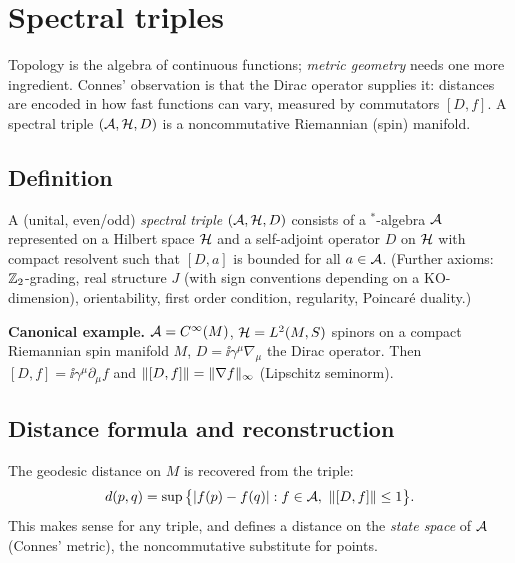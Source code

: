 \section{Spectral triples}\label{ch:spectral_triples}
\skippable

\begin{physmotiv}
Topology is the algebra of continuous functions; \emph{metric geometry} needs one more ingredient. Connes' observation is that the Dirac operator supplies it: distances are encoded in how fast functions can vary, measured by commutators $[D,f]$. A spectral triple $(\mathcal{A},\mathcal{H},D)$ is a noncommutative Riemannian (spin) manifold.
\end{physmotiv}

\subsection{Definition}

\begin{definition}
A (unital, even/odd) \emph{spectral triple} $(\mathcal{A},\mathcal{H},D)$ consists of a $^*$-algebra $\mathcal{A}$ represented on a Hilbert space $\mathcal{H}$ and a self-adjoint operator $D$ on $\mathcal{H}$ with compact resolvent such that $[D,a]$ is bounded for all $a\in\mathcal{A}$. (Further axioms: $\mathbb{Z}_2$-grading, real structure $J$ (with sign conventions depending on a KO-dimension), orientability, first order condition, regularity, Poincar\'e duality.)
\end{definition}

\textbf{Canonical example.} $\mathcal{A}=C^\infty(M)$, $\mathcal{H}=L^2(M,S)$ spinors on a compact Riemannian spin manifold $M$, $D=\ii\gamma^\mu\nabla_\mu$ the Dirac operator. Then $[D,f]=\ii\gamma^\mu\partial_\mu f$ and $\lVert [D,f]\rVert=\lVert \nabla f\rVert_\infty$ (Lipschitz seminorm).

\subsection{Distance formula and reconstruction}

The geodesic distance on $M$ is recovered from the triple:
\begin{equation}
d(p,q)=\sup\big\{|f(p)-f(q)|:f\in\A,\ \norm{[D,f]}\le1\big\}.
\end{equation}
This makes sense for any triple, and defines a distance on the \emph{state space} of $\mathcal{A}$ (Connes' metric), the noncommutative substitute for points.

